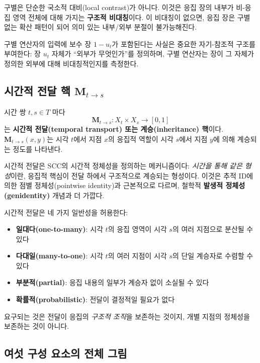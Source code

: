 구별은 단순한 국소적 대비(local contrast)가 아니다. 이것은 응집 장의 내부가 비-응집 영역 전체에 대해 가지는 \textbf{구조적 비대칭}이다. 이 비대칭이 없으면, 응집 장은 구별 없는 확산 패턴이 되어 의미 있는 내부/외부 분절이 불가능해진다.

구별 연산자의 입력에 보수 장 $1-u_t$가 포함된다는 사실은 중요한 자기-참조적 구조를 부여한다: 장 $u_t$ 자체가 ``외부가 무엇인가''를 정의하며, 구별 연산자는 장이 그 자체가 정의한 외부에 대해 비대칭적인지를 측정한다.


\subsection{시간적 전달 핵 $\mathbf{M}_{t \to s}$}

시간 쌍 $t, s \in T$ 마다
\begin{equation}
    \mathbf{M}_{t \to s} : X_t \times X_s \to [0,1]
    \label{eq:transport-kernel}
\end{equation}
는 \textbf{시간적 전달(temporal transport) 또는 계승(inheritance) 핵}이다. $\mathbf{M}_{t \to s}(x,y)$는 시각 $t$에서 지점 $x$의 응집적 역할이 시각 $s$에서 지점 $y$에 의해 계승되는 정도를 나타낸다.

시간적 전달은 SCC의 시간적 정체성을 정의하는 메커니즘이다: \emph{시간을 통해 같은 형성}이란, 응집적 핵심이 전달 하에서 구조적으로 계승되는 형성이다. 이것은 추적 ID에 의한 점별 정체성(pointwise identity)과 근본적으로 다르며, 철학적 \textbf{발생적 정체성(genidentity)} 개념과 더 가깝다.

시간적 전달은 네 가지 일반성을 허용한다:
\begin{itemize}
    \item \textbf{일대다(one-to-many)}: 시각 $t$의 응집 영역이 시각 $s$의 여러 지점으로 분산될 수 있다
    \item \textbf{다대일(many-to-one)}: 시각 $t$의 여러 지점이 시각 $s$의 단일 계승자로 수렴할 수 있다
    \item \textbf{부분적(partial)}: 응집 내용의 일부가 계승자 없이 소실될 수 있다
    \item \textbf{확률적(probabilistic)}: 전달이 결정적일 필요가 없다
\end{itemize}

요구되는 것은 전달이 응집의 \emph{구조적 조직}을 보존하는 것이지, 개별 지점의 정체성을 보존하는 것이 아니다.


\subsection{여섯 구성 요소의 전체 그림}

